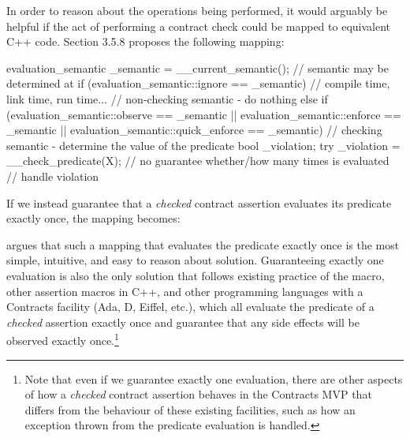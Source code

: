 In order to reason about the operations being performed, it would arguably be helpful if the act of performing a contract check could be mapped to equivalent C++ code. \cite{P2900R6} Section 3.5.8 proposes the following mapping:
\begin{codeblock}
evaluation_semantic _semantic = __current_semantic(); // semantic may be determined at 
if (evaluation_semantic::ignore == _semantic) {       // compile time, link time, run time...
  // non-checking semantic - do nothing
}
else if (evaluation_semantic::observe       == _semantic
      || evaluation_semantic::enforce       == _semantic
      || evaluation_semantic::quick_enforce == _semantic) {
  // checking semantic - determine the value of the predicate
  bool _violation;
  try {
    _violation = __check_predicate(X);   // no guarantee whether/how many times  is evaluated
  }
  // handle violation
}
\end{codeblock}
If we instead guarantee that a \emph{checked} contract assertion evaluates its predicate exactly once, the mapping becomes:
\begin{codeblock}
  // ...
  // checking semantic - determine the value of the predicate
  bool _violation;
  try {
    _violation = !X;   // evaluates  exactly once
  }
  // handle violation
}
\end{codeblock}

\cite{P2756R0} argues that such a mapping that evaluates the predicate exactly once is the most simple, intuitive, and easy to reason about solution. Guaranteeing exactly one evaluation is also the only solution that follows existing practice of the  macro, other assertion macros in C++, and other programming languages with a Contracts facility (Ada, D, Eiffel, etc.), which all evaluate the predicate of a \emph{checked} assertion exactly once and guarantee that any side effects will be observed exactly once.\footnote{Note that even if we guarantee exactly one evaluation, there are other aspects of how a \emph{checked} contract assertion behaves in the Contracts MVP that differs from the behaviour of these existing facilities, such as how an exception thrown from the predicate evaluation is handled.}

